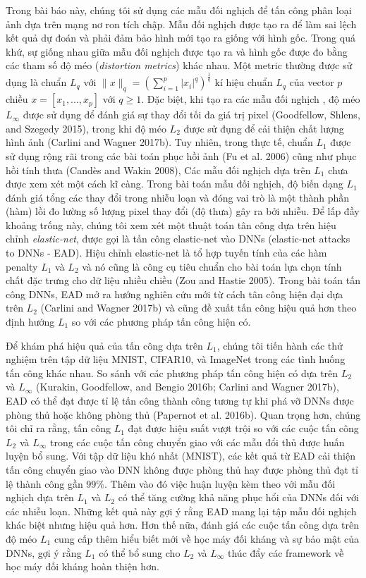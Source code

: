 Trong bài báo này, chúng tôi sử dụng các mẫu đối nghịch để tấn công phân loại ảnh dựa trên 
mạng nơ ron tích chập. Mẫu đối nghịch được tạo ra để làm sai lệch kết quả dự đoán và phải đảm bảo
hình mới tạo ra giống với hình gốc. Trong quá khứ, sự giống nhau giữa mẫu đối nghịch được tạo
ra và hình gốc được đo bằng các tham số độ méo (\textit{distortion metrics}) khác nhau.
Một metric thường được sử dụng là chuẩn $L_q$ 
với $\lVert x \rVert_q = \left( \sum_{i=1}^p |x_i|^q \right)^{\frac{1}{q}}$ kí hiệu chuẩn $L_q$
của vector $p$ chiều $x = [x_1, ..., x_p]$ với $q \geq 1$. Đặc biệt, khi tạo ra các mẫu đối nghịch
, độ méo $L_{\infty}$ được sử dụng để đánh giá sự thay đổi tối đa giá trị pixel (Goodfellow, 
Shlens, and Szegedy 2015), trong khi độ méo $L_2$ được sử đụng để cải thiện chất lượng hình 
ảnh (Carlini and Wagner 2017b). Tuy nhiên, trong thực tế, chuẩn $L_1$ được sử dụng rộng rãi 
trong các bài toán phục hồi ảnh (Fu et al. 2006) cũng như phục hồi tính thưa (Candès and Wakin 2008),
Các mẫu đối nghịch dựa trên $L_1$ chưa được xem xét một cách kĩ càng. Trong bài toán mẫu đối nghịch,
độ biến dạng $L_1$ đánh giá tổng các thay đổi trong nhiễu loạn và đóng vai trò là một thành phần
(hàm) lồi đo lường số lượng pixel thay đổi (độ thưa) gây ra bởi nhiễu. Để lấp đầy khoảng trống
này, chúng tôi xem xét một thuật toán tân công dựa trên hiệu chỉnh \textit{elastic-net}, được 
gọi là tấn công elastic-net vào DNNs (elastic-net attacks to DNNs - EAD). Hiệu chỉnh 
elastic-net là tổ hợp tuyến tính của các hàm penalty $L_1$ và $L_2$ và nó cũng là công cụ 
tiêu chuẩn cho bài toán lựa chọn tính chất đặc trưng cho dữ liệu nhiều chiều (Zou and Hastie 2005). 
Trong bài toán tấn công DNNs, EAD mở ra hướng nghiên cứu mới từ cách tân công hiện đại dựa trên 
$L_2$ (Carlini and Wagner 2017b) và cũng đề xuất tấn công hiệu quả hơn theo định hướng $L_1$
so với các phương pháp tấn công hiện có. 

Để khám phá hiệu quả của tấn công dựa trên $L_1$, chúng tôi tiến hành các thử nghiệm trên tập 
dữ liệu MNIST, CIFAR10, và ImageNet trong các tình huống tấn công khác nhau. So sánh với các 
phương pháp tấn công hiện có dựa trên $L_2$ và $L_{\infty}$ (Kurakin, Goodfellow, and 
Bengio 2016b; Carlini and Wagner 2017b), EAD có thể đạt được tỉ lệ tấn công thành công tương 
tự khi phá vỡ DNNs được phòng thủ hoặc không phòng thủ (Papernot et al. 2016b). Quan trọng 
hơn, chúng tôi chỉ ra rằng, tấn công $L_1$ đạt được hiệu suất vượt trội so với các cuộc tấn
công $L_2$ và $L_{\infty}$ trong các cuộc tấn công chuyển giao với các mẫu đổi thủ được huấn
luyện bổ sung. Với tập dữ liệu khó nhất (MNIST), các kết quả từ EAD cải thiện tấn công chuyển 
giao vào DNN không được phòng thủ hay được phòng thủ đạt tỉ lệ thành công gần $99\%$. Thêm vào 
đó việc huận luyện kèm theo với mẫu đối nghịch dựa trên $L_1$ và $L_2$ có thể tăng cường khả 
năng phục hổi của DNNs đối với các nhiễu loạn. Những kết quả này gợi ý rằng EAD mang lại tập 
mẫu đối nghịch khác biệt nhưng hiệu quả hơn. Hơn thế nữa, đánh giá các cuộc tấn công dựa trên 
độ méo $L_1$ cung cấp thêm hiểu biết mới về học máy đối kháng và sự bảo mật của DNNs, gợi 
ý rằng $L_1$ có thể bổ sung cho $L_2$ và $L_{\infty}$ thúc đẩy các framework về học máy đối 
kháng hoàn thiện hơn.
